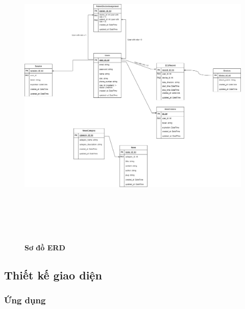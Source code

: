 \begin{figure}[H]
  \centering
  \includegraphics[width=15cm,height=15cm]{Images/server/database/fmECG_architecture-Database.drawio.png}
  \caption[Sơ đồ ERD]{\bfseries \fontsize{12pt}{0pt}\selectfont Sơ đồ ERD}
  \label{fmECG_architecture-Database} %
\end{figure}





\subsection{Thiết kế giao diện}

\subsubsection{Ứng dụng}

